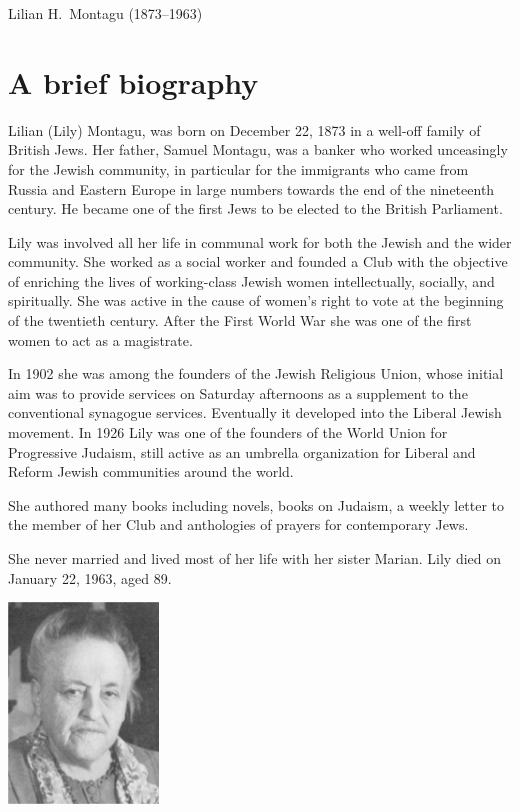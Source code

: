 \documentclass[14pt, article, extrafontsizes, twopage, a4paper]{memoir}
\begin{document}
{
  \centering
  \LARGE Lilian H.\ Montagu (1873–1963)

}

\chapter{A brief biography}

Lilian (Lily) Montagu, was born on December 22, 1873 in a well-off family of British Jews. Her father, Samuel Montagu, was a banker who worked unceasingly for the Jewish community, in particular for the immigrants who came from Russia and Eastern Europe in large numbers towards the end of the nineteenth century. He became one of the first Jews to be elected to the British Parliament.

Lily was involved all her life in communal work for both the Jewish and the wider community. She worked as a social worker and founded a Club with the objective of enriching the lives of working-class Jewish women intellectually, socially, and spiritually. She was active in the cause of women's right to vote at the beginning of the twentieth century. After the First World War she was one of the first women to act as a magistrate.

In 1902 she was among the founders of the Jewish Religious Union, whose initial aim was to provide services on Saturday afternoons as a supplement to the conventional synagogue services. Eventually it developed into the Liberal Jewish movement. In 1926 Lily was one of the founders of the World Union for Progressive Judaism, still active as an umbrella organization for Liberal and Reform Jewish communities around the world.

She authored many books including novels, books on Judaism, a weekly letter to the member of her Club and anthologies of prayers for contemporary Jews.

She never married and lived most of her life with her sister Marian. Lily died on January 22, 1963, aged 89.

{
  \centering
\includegraphics[width=4cm]{lilyolder.png}\\

}
\end{document}
